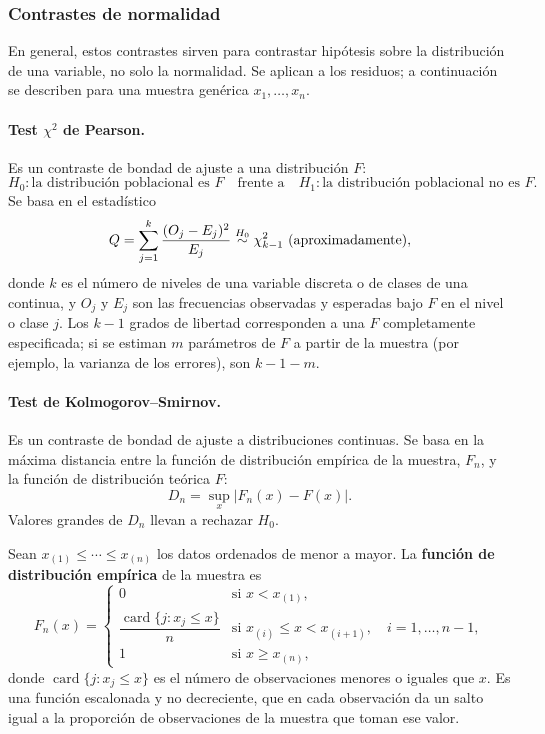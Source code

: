 \subsubsection{Contrastes de normalidad}

En general, estos contrastes sirven para contrastar hipótesis sobre la distribución de una
variable, no solo la normalidad. Se aplican a los residuos; a continuación se describen para
una muestra genérica $x_1,\ldots,x_n$.

\paragraph{Test $\chi^2$ de Pearson.} Es un contraste de bondad de ajuste a una distribución $F$:
\[
  H_0\colon \text{la distribución poblacional es } F
  \quad\text{frente a}\quad
  H_1\colon \text{la distribución poblacional no es } F .
\]
Se basa en el estadístico
\[
  Q = \sum_{j=1}^k \frac{(O_j-E_j)^2}{E_j} \bajoHo \chisq{k-1} \ \text{(aproximadamente)},
\]
donde $k$ es el número de niveles de una variable discreta o de clases de una continua, y $O_j$ y
$E_j$ son las frecuencias observadas y esperadas bajo $F$ en el nivel o clase $j$. Los $k-1$
grados de libertad corresponden a una $F$ completamente especificada; si se estiman $m$
parámetros de $F$ a partir de la muestra (por ejemplo, la varianza de los errores), son $k-1-m$.

\paragraph{Test de Kolmogorov--Smirnov.} Es un contraste de bondad de ajuste a distribuciones
continuas. Se basa en la máxima distancia entre la función de distribución empírica de la
muestra, $F_n$, y la función de distribución teórica $F$:
\[
  D_n = \sup_x\big|F_n(x)-F(x)\big| .
\]
Valores grandes de $D_n$ llevan a rechazar $H_0$.

\begin{definicion}
  Sean $x_{(1)}\le\cdots\le x_{(n)}$ los datos ordenados de menor a mayor. La \textbf{función de
  distribución empírica} de la muestra es
  \[
    F_n(x) =
    \begin{cases}
      0 & \text{si } x < x_{(1)}, \\[2pt]
      \dfrac{\operatorname{card}\{j : x_j\le x\}}{n} & \text{si } x_{(i)}\le x<x_{(i+1)},\quad i=1,\ldots,n-1, \\[8pt]
      1 & \text{si } x\ge x_{(n)},
    \end{cases}
  \]
  donde $\operatorname{card}\{j : x_j\le x\}$ es el número de observaciones menores o iguales
  que $x$. Es una función escalonada y no decreciente, que en cada observación da un salto igual
  a la proporción de observaciones de la muestra que toman ese valor.
\end{definicion}


